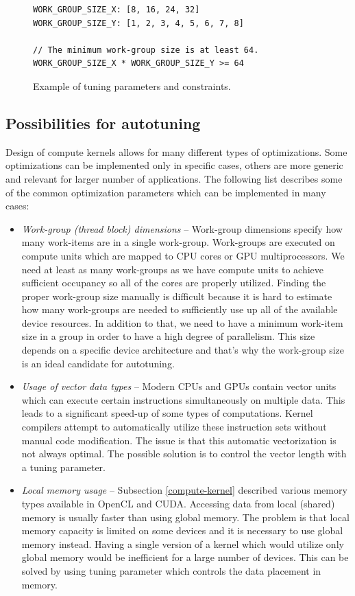 \documentclass[
  digital,     %
  oneside,     %
  nosansbold,  %
  nocolorbold, %
  lof,         %
  lot,         %
  nocover
]{fithesis4}
\begin{document}
\begin{figure}
\begin{lstlisting}
WORK_GROUP_SIZE_X: [8, 16, 24, 32]
WORK_GROUP_SIZE_Y: [1, 2, 3, 4, 5, 6, 7, 8]

// The minimum work-group size is at least 64.
WORK_GROUP_SIZE_X * WORK_GROUP_SIZE_Y >= 64
\end{lstlisting}
\caption{Example of tuning parameters and constraints.}
\label{vector_addition}
\end{figure}

\subsection{Possibilities for autotuning}
Design of compute kernels allows for many different types of optimizations. Some optimizations can be implemented only in specific cases, others are more generic and relevant for larger number of applications. The following list describes some of the common optimization parameters which can be implemented in many cases:

\begin{itemize}
	\item \textit{Work-group (thread block) dimensions} -- Work-group dimensions specify how many work-items are in a single work-group. Work-groups are executed on compute units which are mapped to CPU cores or GPU multiprocessors. We need at least as many work-groups as we have compute units to achieve sufficient occupancy so all of the cores are properly utilized. Finding the proper work-group size manually is difficult because it is hard to estimate how many work-groups are needed to sufficiently use up all of the available device resources. In addition to that, we need to have a minimum work-item size in a group in order to have a high degree of parallelism. This size depends on a specific device architecture and that's why the work-group size is an ideal candidate for autotuning.
	\item \textit{Usage of vector data types} -- Modern CPUs and GPUs contain vector units which can execute certain instructions simultaneously on multiple data. This leads to a significant speed-up of some types of computations. Kernel compilers attempt to automatically utilize these instruction sets without manual code modification. The issue is that this automatic vectorization is not always optimal. The possible solution is to control the vector length with a tuning parameter.
	\item \textit{Local memory usage} -- Subsection \ref{compute-kernel} described various memory types available in OpenCL and CUDA. Accessing data from local (shared) memory is usually faster than using global memory. The problem is that local memory capacity is limited on some devices and it is necessary to use global memory instead. Having a single version of a kernel which would utilize only global memory would be inefficient for a large number of devices. This can be solved by using tuning parameter which controls the data placement in memory.
\end{itemize}
\end{document}
